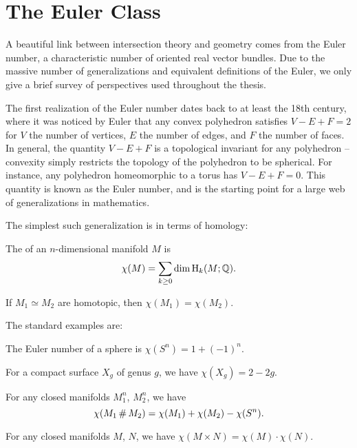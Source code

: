 \section{The Euler Class}\label{sec:euler-class}

A beautiful link between intersection theory and geometry comes from the Euler number, a characteristic number of oriented real vector bundles. Due to the massive number of generalizations and equivalent definitions of the Euler, we only give a brief survey of perspectives used throughout the thesis.

The first realization of the Euler number dates back to at least the 18th century, where it was noticed by Euler that any convex polyhedron satisfies $V-E+F=2$ for $V$ the number of vertices, $E$ the number of edges, and $F$ the number of faces. 
In general, the quantity $V-E+F$ is a topological invariant for any polyhedron -- convexity simply restricts the topology of the polyhedron to be spherical.
For instance, any polyhedron homeomorphic to a torus has $V-E+F=0$. 
This quantity is known as the Euler number, and is the starting point for a large web of generalizations in mathematics. 


The simplest such generalization is in terms of homology:

\begin{definition}
  The  of an $n$-dimensional manifold $M$ is
  \[
    \chi(M) = \sum_{k\geq 0} \dim \operatorname{H}_k(M; \mathbb{Q}).
  \]
\end{definition}

\begin{proposition}
  If $M_1\simeq M_2$ are homotopic, then $\chi(M_1)=\chi(M_2)$.
\end{proposition}

The standard examples are:

\begin{example}
  The Euler number of a sphere is $\chi(S^n)=1+(-1)^n$.
\end{example}

\begin{example}
  For a compact surface $X_g$ of genus $g$, we have $\chi(X_g)=2-2g$.
\end{example}

\begin{proposition}
  For any closed manifolds $M_1^n$, $M_2^n$, we have 
  \[\chi(M_1\+M_2)=\chi(M_1)+\chi(M_2)-\chi(S^n).\]
\end{proposition}

\begin{proposition}
  For any closed manifolds $M$, $N$, we have $\chi(M\times N)=\chi(M)\cdot \chi(N)$.
\end{proposition}

